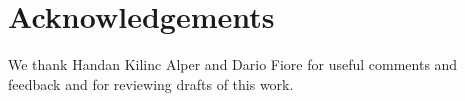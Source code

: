 \section{Acknowledgements}
We thank Handan Kilinc Alper and Dario Fiore for useful comments and feedback and for reviewing drafts of this work. 
\label{sec:acknowledge}


